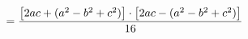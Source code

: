 \documentclass[preview]{standalone}
\begin{document}
\begin{align*}
\special{dvisvgm:raw <g id='unique000'>}= \frac{\bigl[2ac+(a^2-b^2+c^2)\bigr]\cdot\bigl[2ac-(a^2-b^2+c^2)\bigr]}{16}\special{dvisvgm:raw </g>}
\end{align*}
\end{document}
